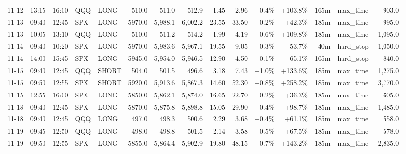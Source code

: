 \documentclass[11pt,a4paper,twoside]{article}
\begin{document}
\begin{landscape}
\begin{center}
\begin{longtable}{>{\color{txtmain}}l l l l l r r r r r r r r >{\color{txtmain}}l r}
11-12 & 13:15 & 16:00 & QQQ & LONG & 510.0 & 511.0 & 512.9 & 1.45 & 2.96 & \textcolor{wingreen}{+0.4\%} & \textcolor{wingreen}{+103.8\%} & 165m & max\_time & \textcolor{wingreen}{903.0} \\
11-13 & 09:40 & 12:45 & SPX & LONG & 5970.0 & 5,988.1 & 6,002.2 & 23.55 & 33.50 & \textcolor{wingreen}{+0.2\%} & \textcolor{wingreen}{+42.3\%} & 185m & max\_time & \textcolor{wingreen}{995.0} \\
11-13 & 10:05 & 13:10 & QQQ & LONG & 510.0 & 511.2 & 514.2 & 1.99 & 4.19 & \textcolor{wingreen}{+0.6\%} & \textcolor{wingreen}{+109.8\%} & 185m & max\_time & \textcolor{wingreen}{1,095.0} \\
11-14 & 09:40 & 10:20 & SPX & LONG & 5970.0 & 5,983.6 & 5,967.1 & 19.55 & 9.05 & \textcolor{lossred}{-0.3\%} & \textcolor{lossred}{-53.7\%} & 40m & hard\_stop & \textcolor{lossred}{-1,050.0} \\
11-14 & 14:00 & 15:45 & SPX & LONG & 5945.0 & 5,954.0 & 5,946.5 & 12.90 & 4.50 & \textcolor{lossred}{-0.1\%} & \textcolor{lossred}{-65.1\%} & 105m & hard\_stop & \textcolor{lossred}{-840.0} \\
11-15 & 09:40 & 12:45 & QQQ & SHORT & 504.0 & 501.5 & 496.6 & 3.18 & 7.43 & \textcolor{wingreen}{+1.0\%} & \textcolor{wingreen}{+133.6\%} & 185m & max\_time & \textcolor{wingreen}{1,275.0} \\
11-15 & 09:50 & 12:55 & SPX & SHORT & 5920.0 & 5,913.6 & 5,867.3 & 14.60 & 52.30 & \textcolor{wingreen}{+0.8\%} & \textcolor{wingreen}{+258.2\%} & 185m & max\_time & \textcolor{wingreen}{3,770.0} \\
11-15 & 12:55 & 16:00 & SPX & LONG & 5850.0 & 5,862.1 & 5,874.0 & 16.65 & 22.70 & \textcolor{wingreen}{+0.2\%} & \textcolor{wingreen}{+36.3\%} & 185m & max\_time & \textcolor{wingreen}{605.0} \\
11-18 & 09:40 & 12:45 & SPX & LONG & 5870.0 & 5,875.8 & 5,898.8 & 15.05 & 29.90 & \textcolor{wingreen}{+0.4\%} & \textcolor{wingreen}{+98.7\%} & 185m & max\_time & \textcolor{wingreen}{1,485.0} \\
11-18 & 09:40 & 12:45 & QQQ & LONG & 497.0 & 498.3 & 500.6 & 2.29 & 3.68 & \textcolor{wingreen}{+0.4\%} & \textcolor{wingreen}{+61.1\%} & 185m & max\_time & \textcolor{wingreen}{558.0} \\
11-19 & 09:45 & 12:50 & QQQ & LONG & 498.0 & 498.8 & 501.5 & 2.14 & 3.58 & \textcolor{wingreen}{+0.5\%} & \textcolor{wingreen}{+67.5\%} & 185m & max\_time & \textcolor{wingreen}{578.0} \\
11-19 & 09:50 & 12:55 & SPX & LONG & 5855.0 & 5,864.4 & 5,902.9 & 19.80 & 48.15 & \textcolor{wingreen}{+0.7\%} & \textcolor{wingreen}{+143.2\%} & 185m & max\_time & \textcolor{wingreen}{2,835.0} \\

\end{longtable}
\end{center}
\end{landscape}
\end{document}
